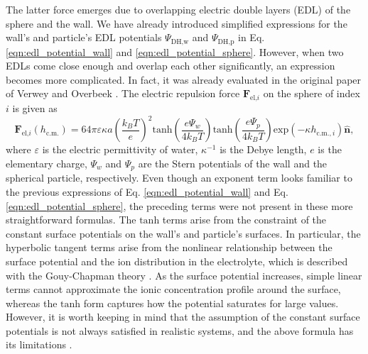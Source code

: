 \documentclass{master_thesis}
\begin{document}
The latter force emerges due to overlapping electric double layers (EDL) of the sphere and the wall. We have already introduced simplified expressions for the wall's and particle's EDL potentials $\Psi_{\textrm{DH,w}}$ and $\Psi_{\textrm{DH,p}}$ in Eq. \eqref{eqn:edl_potential_wall} and \eqref{eqn:edl_potential_sphere}. However, when two EDLs come close enough and overlap each other significantly, an expression becomes more complicated. In fact, it was already evaluated in the original paper of Verwey and Overbeek \cite{verwey_overbeek_1948}. The electric repulsion force $\boldsymbol{F}_{\textrm{el,}i}$ on the sphere of index $i$ is given as
\begin{equation}
    \boldsymbol{F}_{\textrm{el,}i}(h_{\textrm{c.m.}}) = 64 \pi \varepsilon \kappa a \left( \frac{k_B T}{e} \right)^2 \textrm{tanh} \left( \frac{e \Psi_w}{4 k_B T} \right) \textrm{tanh} \left( \frac{e \Psi_p}{4 k_B T} \right) \textrm{exp} \left(- \kappa h_{\textrm{c.m}.,i} \right) \hat{\boldsymbol{n}},
\label{eqn:electrostatic_force}
\end{equation}
where $\varepsilon$ is the electric permittivity of water, $\kappa^{-1}$ is the Debye length, $e$ is the elementary charge, $\Psi_w$ and $\Psi_p$ are the Stern potentials of the wall and the spherical particle, respectively. Even though an exponent term looks familiar to the previous expressions of Eq. \eqref{eqn:edl_potential_wall} and Eq. \eqref{eqn:edl_potential_sphere}, the preceding terms were not present in these more straightforward formulas. The $\textrm{tanh}$ terms arise from the constraint of the constant surface potentials on the wall's and particle's surfaces. In particular, the hyperbolic tangent terms arise from the nonlinear relationship between the surface potential and the ion distribution in the electrolyte, which is described with the Gouy-Chapman theory \cite{gouy_1910,chapman_1913}. As the surface potential increases, simple linear terms cannot approximate the ionic concentration profile around the surface, whereas the $\textrm{tanh}$ form captures how the potential saturates for large values. However, it is worth keeping in mind that the assumption of the constant surface potentials is not always satisfied in realistic systems, and the above formula has its limitations \cite{verwey_overbeek_1948}.
\end{document}
